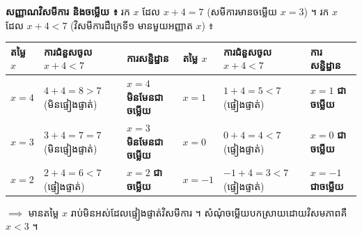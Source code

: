 \documentclass[theme=teal]{khmermath}
\newcommand{\koreahl}[1]{\colorbox{koreaYellow}{\fontsize{8.5}{8.5}\selectfont #1}}
\begin{document}
\begin{khcard}
  \noindent
  \textbf{ សញ្ញាណវិសមីការ និងចម្លើយ ៖} រក $x$ ដែល $x + 4 = 7$ (សមីការមានចម្លើយ $x = 3$) ។ រក $x$ ដែល $x + 4 < 7$ (វិសមីការដឺក្រេទី១ មានមួយអញ្ញាត $x$) ៖
  \vspace{1pt}
  \begin{center}
  \fontsize{7}{7}\selectfont
  \begin{tabular}{|l|l|l||l|l|l|}
    \hline
    \rowcolor{brandNavy!10}
    \textbf{តម្លៃ $x$} & \textbf{ការជំនួសចូល $x+4 < 7$} & \textbf{ការសន្និដ្ឋាន} & \textbf{តម្លៃ $x$} & \textbf{ការជំនួសចូល $x+4 < 7$} & \textbf{ការសន្និដ្ឋាន} \\ \hline
    $x = 4$ & $4 + 4 = 8 > 7$ (មិនផ្ទៀងផ្ទាត់) & $x = 4$ \textbf{មិនមែនជាចម្លើយ} & $x = 1$ & $1 + 4 = 5 < 7$ (ផ្ទៀងផ្ទាត់) & $x = 1$ \textbf{ជាចម្លើយ} \\ \hline
    $x = 3$ & $3 + 4 = 7 = 7$ (មិនផ្ទៀងផ្ទាត់) & $x = 3$ \textbf{មិនមែនជាចម្លើយ} & $x = 0$ & $0 + 4 = 4 < 7$ (ផ្ទៀងផ្ទាត់) & $x = 0$ \textbf{ជាចម្លើយ} \\ \hline
    $x = 2$ & $2 + 4 = 6 < 7$ (ផ្ទៀងផ្ទាត់) & $x = 2$ \textbf{ជាចម្លើយ} & $x = -1$ & $-1 + 4 = 3 < 7$ (ផ្ទៀងផ្ទាត់) & $x = -1$ \textbf{ជាចម្លើយ} \\ \hline
  \end{tabular}
  \end{center}
  \vspace{-1pt}
  \noindent
  $\implies$ មានតម្លៃ $x$ រាប់មិនអស់ដែលផ្ទៀងផ្ទាត់វិសមីការ ។ សំណុំចម្លើយបកស្រាយដោយវិសមភាពគឺ \koreahl{$x < 3$} ។
\end{khcard}
\end{document}
